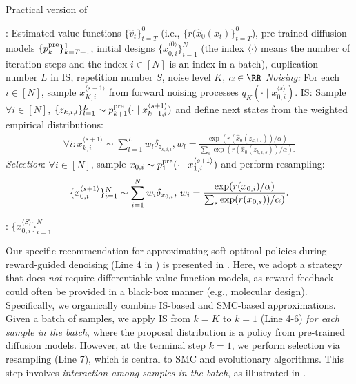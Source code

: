 \begin{algorithm}[!th]
\caption{Practical version of \alg }\label{alg:decoding2}
\begin{algorithmic}[1]
     : Estimated value functions $\{\hat v_t\}_{t=T}^0$ (i.e., $\{r(\hat x_0(x_t)\}_{t=T}^0$), pre-trained diffusion models $\{p^{\mathrm{pre}}_k\}_{k=T+1}^1$, initial designs $\{x^{\langle 0\rangle }_{0,i}\}_{i=1}^N$ (the index $\langle \cdot \rangle $ means the number of iteration steps and the index $i \in [N]$ is an index in a batch), duplication number $L$ in IS, repetition number $S$, noise level $K$, $\alpha \in \RR$
       \STATE   \emph{Noising:} For each $i\in [N]$, sample $x^{\langle s+1 \rangle }_{K,i}$ from forward noising processes $q_K(\cdot \mid x^{\langle s \rangle }_{0,i})$.  
        \STATE IS: Sample $\forall i \in [N]$, $\{z_{k,i,l}\}_{l=1}^{L} \sim p^{\mathrm{pre}}_{k+1}(\cdot \mid x^{\langle s+1 \rangle }_{k+1,i}) $ and define next states from the weighted empirical distributions:
        {\small 
        \begin{align*}
            \forall i:   x^{\langle s+1 \rangle }_{k,i} \sim \sum_{l=1}^L w_l \delta_{z_{k,i,l}}, w_l =  \frac{\exp(r(\hat x_0(z_{k,i,l}))/\alpha)}{\sum_s \exp(r(\hat x_0(z_{k,i,s}))/\alpha). }    
        \end{align*}
        } 
         \ENDFOR  
        \STATE \emph{Selection}: $\forall i \in [N]$, sample $x_{0,i} \sim p^{\mathrm{pre}}_1(\cdot \mid x^{\langle s+1 \rangle }_{1,i}) $ and perform resampling: 
        {\small 
        \begin{align*}
          {\tiny \{x^{\langle s+1 \rangle }_{0,i}\}_{i=1}^N \sim  \sum_{i=1}^N w_i \delta_{x_{0,i}},\,w_i =  \frac{\exp(r (x_{0,i})/\alpha)}{\sum_s \exp(r(x_{0,s}))/\alpha)  }.  } 
        \end{align*}
        } 
        
        
     \ENDFOR 
  : $\{ x^{\langle S \rangle}_{0,i} \}_{i=1}^N$
\end{algorithmic}
\end{algorithm} 

Our specific recommendation for approximating soft optimal policies during reward-guided denoising (Line 4 in ) is presented in . Here, we adopt a strategy that does \emph{not} require differentiable value function models, as reward feedback could often be provided in a black-box manner (e.g., molecular design). Specifically, we organically combine IS-based and SMC-based approximations. Given a batch of samples, we apply IS from $k=K$ to $k=1$ (Line 4-6) \emph{for each sample in the batch}, where the proposal distribution is a policy from pre-trained diffusion models. However, at the terminal step $k=1$, we perform selection via resampling (Line 7), which is central to SMC and evolutionary algorithms. This step involves \emph{interaction among samples in the batch}, as illustrated in . 



